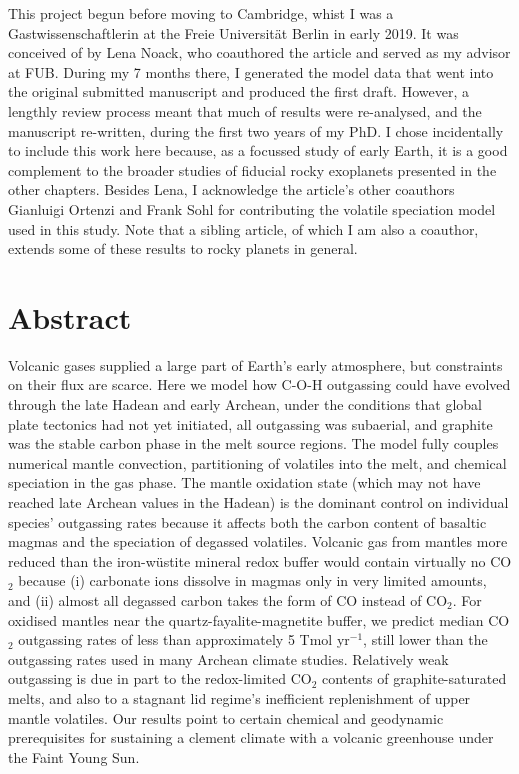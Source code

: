 This project begun before moving to Cambridge, whist I was a Gastwissenschaftlerin at the Freie Universit\"at Berlin in early 2019. It was conceived of by Lena Noack, who coauthored the article and served as my advisor at FUB. During my 7 months there, I generated the model data that went into the original submitted manuscript and produced the first draft. However, a lengthly review process meant that much of results were re-analysed, and the manuscript re-written, during the first two years of my PhD. I chose incidentally to include this work here because, as a focussed study of early Earth, it is a good complement to the broader studies of fiducial rocky exoplanets presented in the other chapters. Besides Lena, I acknowledge the article's other coauthors Gianluigi Ortenzi and Frank Sohl for contributing the volatile speciation model used in this study. Note that a sibling article, \citet{ortenzi_mantle_2020} of which I am also a coauthor, extends some of these results to rocky planets in general.


\section*{Abstract}
Volcanic gases supplied a large part of Earth's early atmosphere, but constraints on their flux are scarce. Here we model how C-O-H outgassing could have evolved through the late Hadean and early Archean, under the conditions that global plate tectonics had not yet initiated, all outgassing was subaerial, and graphite was the stable carbon phase in the melt source regions. The model fully couples numerical mantle convection, partitioning of volatiles into the melt, and chemical speciation in the gas phase. The mantle oxidation state (which may not have reached late Archean values in the Hadean) is the dominant control on individual species' outgassing rates because it affects both the carbon content of basaltic magmas and the speciation of degassed volatiles. Volcanic gas from mantles more reduced than the iron-w\"ustite mineral redox buffer would contain virtually no CO$_2$ because (i) carbonate ions dissolve in magmas only in very limited amounts, and (ii) almost all degassed carbon takes the form of CO instead of CO$_2$. For oxidised mantles near the quartz-fayalite-magnetite buffer, we predict median CO$_2$ outgassing rates of less than approximately 5 Tmol yr$^{-1}$, still lower than the outgassing rates used in many Archean climate studies. Relatively weak outgassing is due in part to the redox-limited CO$_2$ contents of graphite-saturated melts, and also to a stagnant lid regime's inefficient replenishment of upper mantle volatiles. Our results point to certain chemical and geodynamic prerequisites for sustaining a clement climate with a volcanic greenhouse under the Faint Young Sun.



